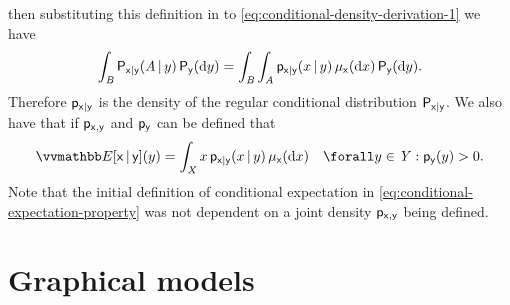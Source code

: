 then substituting this definition in to \eqref{eq:conditional-density-derivation-1} we have
\begin{equation}\label{eq:conditional-density-derivation-2}
  \int_{\mathit{B}} \mathsf{P}_{\mathsf{x}|\mathsf{y}}(\mathit{A}\operatorname{|} y) \,\mathsf{P}_{\mathsf{y}}(\mathrm{d} y)
  =
  \int_{\mathit{B}}\int_{\mathit{A}} 
    \mathsf{p}_{\mathsf{x}|\mathsf{y}}(x\operatorname{|} y)
  \,\mu_{\mathsf{x}}(\mathrm{d} x)\,\mathsf{P}_{\mathsf{y}}(\mathrm{d} y).
\end{equation}
Therefore $\mathsf{p}_{\mathsf{x}|\mathsf{y}}$ is the density of the regular conditional distribution $\mathsf{P}_{\mathsf{x}|\mathsf{y}}$. We also have that if $\mathsf{p}_{\mathsf{x},\mathsf{y}}$ and $\mathsf{p}_{\mathsf{y}}$ can be defined that 
\begin{equation}\label{eq:conditional-expectation-density}
  \expc{\rvar{x}\gvn\rvar{y}}(y) =
  \int_{\set{X}} x\,\pden{\rvar{x}|\rvar{y}}(x\gvn y) \,\mu_{\rvar{x}}(\dr x)
  \quad \forall y \in \set{Y} : \pden{\rvar{y}}(y) > 0.
\end{equation}
Note that the initial definition of conditional expectation in \eqref{eq:conditional-expectation-property} was not dependent on a joint density $\mathsf{p}_{\mathsf{x},\mathsf{y}}$ being defined. %


\section{Graphical models}\label{sec:graphical-models}

